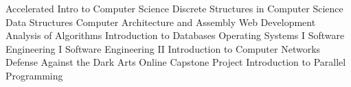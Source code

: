 \begin{multicols}{2}
\begin{itemize}[label=$\triangleright$]
 Accelerated Intro to Computer Science
 Discrete Structures in Computer Science
 Data Structures
 Computer Architecture and Assembly
 Web Development
 Analysis of Algorithms
 Introduction to Databases
 Operating Systems I
 Software Engineering I
 Software Engineering II
 Introduction to Computer Networks
 Defense Against the Dark Arts
 Online Capstone Project
 Introduction to Parallel Programming
\end{itemize}
\end{multicols}

